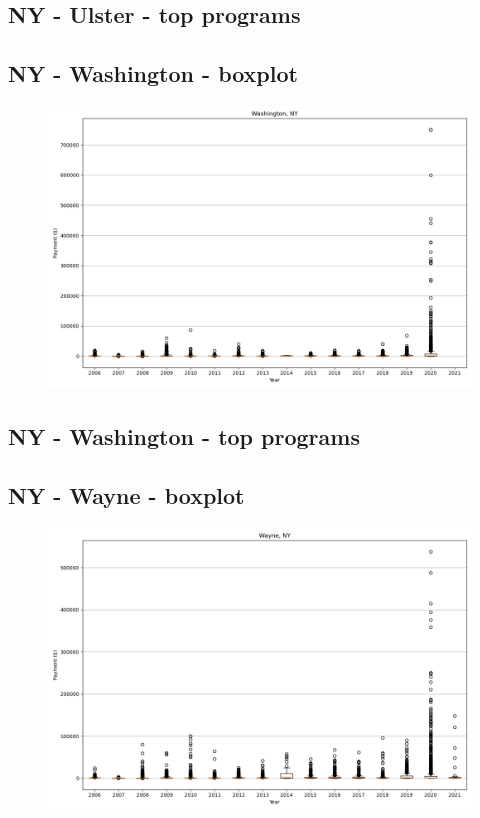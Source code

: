 \subsection*{NY - Ulster - top programs}

\newpage
\subsection*{NY - Washington - boxplot}
\begin{figure}[h]
\centering
\includegraphics[width=7in]{../output/boxplots/counties/Washington-NY_boxplot.png}
\end{figure}


\subsection*{NY - Washington - top programs}

\newpage
\subsection*{NY - Wayne - boxplot}
\begin{figure}[h]
\centering
\includegraphics[width=7in]{../output/boxplots/counties/Wayne-NY_boxplot.png}
\end{figure}


